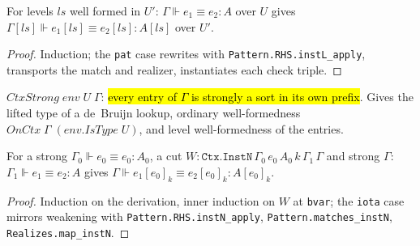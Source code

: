 \begin{lemma}
\label{thm:strong-instl}
\leanok
{}

 For levels $ls$ well formed in $U'$: $\Gamma\Vdash e_1\equiv e_2:A$ over $U$
gives $\Gamma[ls]\Vdash e_1[ls]\equiv e_2[ls]:A[ls]$ over $U'$.
\end{lemma}
\begin{proof}
\leanok
{} Induction; the \texttt{pat} case rewrites with \texttt{Pattern.RHS.instL\_apply},
transports the match and realizer, instantiates each check triple.
\end{proof}

\begin{definition}
\label{def:ctxstrong}
\leanok
{}

 $CtxStrong\;env\;U\;\Gamma$: \hl{every entry of $\Gamma$ is strongly a sort in
its own prefix}. Gives the lifted type of a de~Bruijn lookup, ordinary well-formedness
$OnCtx\;\Gamma\;(env.IsType\;U)$, and level well-formedness of the entries.
\end{definition}

\begin{theorem}
\label{thm:strong-instn}
\leanok
{}

 For a strong $\Gamma_0\Vdash e_0\equiv e_0:A_0$, a cut
$W:\mathtt{Ctx.InstN}\,\Gamma_0\,e_0\,A_0\,k\,\Gamma_1\,\Gamma$ and strong $\Gamma$:
$\Gamma_1\Vdash e_1\equiv e_2:A$ gives
$\Gamma\Vdash e_1[e_0]_k\equiv e_2[e_0]_k:A[e_0]_k$.
\end{theorem}
\begin{proof}
\leanok
{} Induction on the derivation, inner induction on $W$ at \texttt{bvar}; the
\texttt{iota} case mirrors weakening with \texttt{Pattern.RHS.instN\_apply},
\texttt{Pattern.matches\_instN}, \texttt{Realizes.map\_instN}.
\end{proof}

